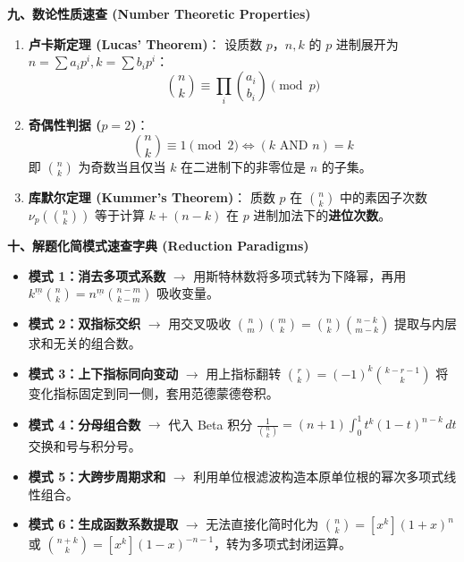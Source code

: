 \textbf{九、数论性质速查 (Number Theoretic Properties)}
\begin{enumerate}
    \item \textbf{卢卡斯定理 (Lucas' Theorem)}：
    设质数 $p$，$n, k$ 的 $p$ 进制展开为 $n = \sum a_i p^i, k = \sum b_i p^i$：
    \[
    \binom{n}{k} \equiv \prod_{i} \binom{a_i}{b_i} \pmod p
    \]
    \item \textbf{奇偶性判据 ($p=2$)}：
    \[
    \binom{n}{k} \equiv 1 \pmod 2 \iff (k \text{ AND } n) = k
    \]
    即 $\binom{n}{k}$ 为奇数当且仅当 $k$ 在二进制下的非零位是 $n$ 的子集。
    \item \textbf{库默尔定理 (Kummer's Theorem)}：
    质数 $p$ 在 $\binom{n}{k}$ 中的素因子次数 $\nu_p\left(\binom{n}{k}\right)$ 等于计算 $k + (n-k)$ 在 $p$ 进制加法下的\textbf{进位次数}。
\end{enumerate}

\textbf{十、解题化简模式速查字典 (Reduction Paradigms)}
\begin{itemize}
    \item \textbf{模式 1：消去多项式系数} $\to$ 用斯特林数将多项式转为下降幂，再用 $k^{\underline{m}} \binom{n}{k} = n^{\underline{m}} \binom{n-m}{k-m}$ 吸收变量。
    \item \textbf{模式 2：双指标交织} $\to$ 用交叉吸收 $\binom{n}{m} \binom{m}{k} = \binom{n}{k} \binom{n-k}{m-k}$ 提取与内层求和无关的组合数。
    \item \textbf{模式 3：上下指标同向变动} $\to$ 用上指标翻转 $\binom{r}{k} = (-1)^k \binom{k-r-1}{k}$ 将变化指标固定到同一侧，套用范德蒙德卷积。
    \item \textbf{模式 4：分母组合数} $\to$ 代入 Beta 积分 $\frac{1}{\binom{n}{k}} = (n+1) \int_0^1 t^k (1-t)^{n-k} \, dt$ 交换和号与积分号。
    \item \textbf{模式 5：大跨步周期求和} $\to$ 利用单位根滤波构造本原单位根的幂次多项式线性组合。
    \item \textbf{模式 6：生成函数系数提取} $\to$ 无法直接化简时化为 $\binom{n}{k} = [x^k] (1+x)^n$ 或 $\binom{n+k}{k} = [x^k] (1-x)^{-n-1}$，转为多项式封闭运算。
\end{itemize}
